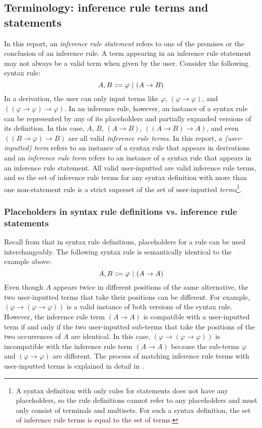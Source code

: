 \subsection{Terminology: inference rule terms and statements}
In this report, an \textit{inference rule statement} refers to one of the premises or the conclusion of an inference rule. A term appearing in an inference rule statement may not always be a valid term when given by the user. Consider the following syntax rule:
\[
    A, B \Coloneqq \varphi \ |\  (A \to B)
\]
In a derivation, the user can only input terms like $\varphi$, $(\varphi \to \varphi)$, and $((\varphi \to \varphi) \to \varphi)$. In an inference rule, however, an instance of a syntax rule can be represented by any of its placeholders and partially expanded versions of its definition. In this case, $A$, $B$, $(A \to B)$, $((A \to B) \to A)$, and even $((B \to \varphi) \to B)$ are all valid \textit{inference rule terms}. In this report, a \textit{(user-inputted) term} refers to an instance of a syntax rule that appears in derivations and an \textit{inference rule term} refers to an instance of a syntax rule that appears in an inference rule statement. All valid user-inputted are valid inference rule terms, and so the set of inference rule terms for any syntax definition with more than one non-statement rule is a strict superset of the set of user-inputted \textit{terms}\footnote{A syntax definition with only rules for statements does not have any placeholders, so the rule definitions cannot refer to any placeholders and must only consist of terminals and multisets. For such a syntax definition, the set of inference rule terms is equal to the set of terms.}.

\subsubsection{Placeholders in syntax rule definitions vs. inference rule statements}
Recall from  that in syntax rule definitions, placeholders for a rule can be used interchangeably. The following syntax rule is semantically identical to the example above:
\[
    A, B \Coloneqq \varphi \ |\  (A \to A)
\]
Even though $A$ appears twice in different positions of the same alternative, the two user-inputted terms that take their positions can be different. For example, $(\varphi \to (\varphi \to \varphi))$ is a valid instance of both versions of the syntax rule. However, the inference rule term $(A \to A)$ is compatible with a user-inputted term if and only if the two user-inputted sub-terms that take the positions of the two occurrences of $A$ are identical. In this case, $(\varphi \to (\varphi \to \varphi))$ is incompatible with the inference rule term $(A \to A)$ because the sub-terms $\varphi$ and $(\varphi \to \varphi)$ are different. The process of matching inference rule terms with user-inputted terms is explained in detail in .

